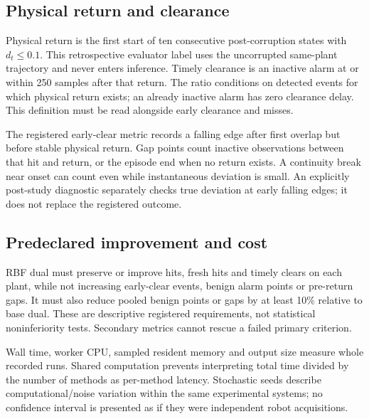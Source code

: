 \subsection{Physical return and clearance}
Physical return is the first start of ten consecutive post-corruption states with $d_t\le0.1$. This retrospective evaluator label uses the uncorrupted same-plant trajectory and never enters inference. Timely clearance is an inactive alarm at or within 250 samples after that return. The ratio conditions on detected events for which physical return exists; an already inactive alarm has zero clearance delay. This definition must be read alongside early clearance and misses.

The registered early-clear metric records a falling edge after first overlap but before stable physical return. Gap points count inactive observations between that hit and return, or the episode end when no return exists. A continuity break near onset can count even while instantaneous deviation is small. An explicitly post-study diagnostic separately checks true deviation at early falling edges; it does not replace the registered outcome.

\subsection{Predeclared improvement and cost}
RBF dual must preserve or improve hits, fresh hits and timely clears on each plant, while not increasing early-clear events, benign alarm points or pre-return gaps. It must also reduce pooled benign points or gaps by at least 10\% relative to base dual. These are descriptive registered requirements, not statistical noninferiority tests. Secondary metrics cannot rescue a failed primary criterion.

Wall time, worker CPU, sampled resident memory and output size measure whole recorded runs. Shared computation prevents interpreting total time divided by the number of methods as per-method latency. Stochastic seeds describe computational/noise variation within the same experimental systems; no confidence interval is presented as if they were independent robot acquisitions.

